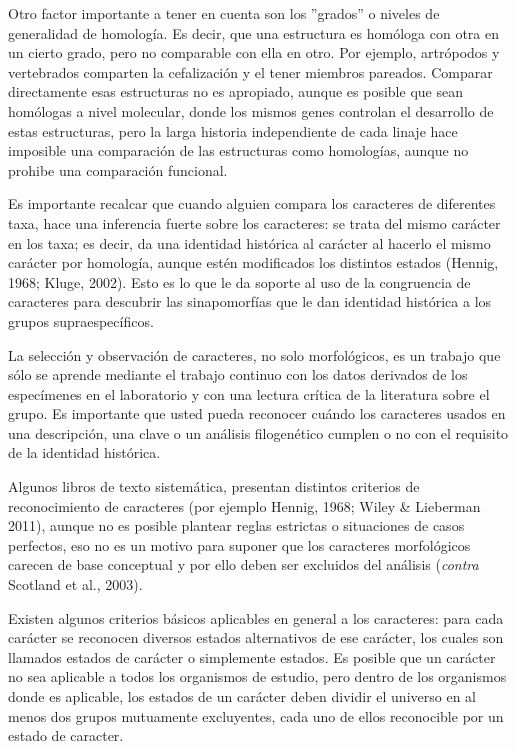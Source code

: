 Otro factor importante a tener en cuenta son los ''grados'' o 
niveles de generalidad de homolog\'ia. Es decir, que una estructura 
es hom\'ologa con otra en un cierto grado, pero no comparable con 
ella en otro. Por ejemplo, artr\'opodos y vertebrados comparten la 
cefalizaci\'on y el tener miembros pareados. Comparar directamente 
esas estructuras no es apropiado, aunque es posible que sean 
hom\'ologas a nivel molecular, donde los mismos genes controlan el 
desarrollo de estas estructuras, pero la larga historia 
independiente de cada linaje hace imposible una comparaci\'on de las 
estructuras como homolog\'ias, aunque no prohibe una comparaci\'on 
funcional. 

Es importante recalcar que cuando alguien compara los 
caracteres de diferentes taxa, hace una inferencia fuerte sobre los 
caracteres: se trata del mismo car\'acter en los taxa; es decir, da 
una identidad hist\'orica al car\'acter al hacerlo el mismo car\'acter 
por homolog\'ia, aunque est\'en modificados los distintos 
estados (Hennig, 1968; Kluge, 2002). Esto es lo que le da soporte al 
uso de la congruencia de caracteres para descubrir las sinapomorf\'
ias que le dan identidad hist\'orica a los grupos supraespec\'ificos.

 
La selecci\'on y observaci\'on de caracteres, no solo morfol\'ogicos, es un trabajo que s\'olo se aprende mediante el trabajo continuo con los datos derivados de los espec\'imenes en el laboratorio y con una lectura cr\'itica de la literatura sobre el grupo. Es importante que usted pueda reconocer cu\'ando los caracteres usados en una descripci\'on, una clave o un an\'alisis filogen\'etico cumplen o no con el requisito de la identidad hist\'orica.


Algunos libros de texto  sistem\'atica, presentan distintos criterios de reconocimiento de caracteres (por ejemplo Hennig, 1968; Wiley \&  Lieberman 2011), aunque no es posible plantear reglas estrictas o situaciones de casos perfectos, eso no es un motivo para suponer que los caracteres morfol\'ogicos carecen de base conceptual y por ello deben ser excluidos del an\'alisis (\textit{contra} Scotland et al., 2003).

Existen algunos criterios b\'asicos aplicables en general a los caracteres: para cada car\'acter se reconocen diversos estados alternativos de ese car\'acter, los cuales son llamados estados de car\'acter o simplemente estados. Es posible que un car\'acter no sea aplicable a todos los organismos de estudio, pero dentro de los organismos donde es aplicable, los estados de un car\'acter deben dividir el universo en al menos dos grupos mutuamente excluyentes, cada uno de ellos reconocible por un estado de caracter.


